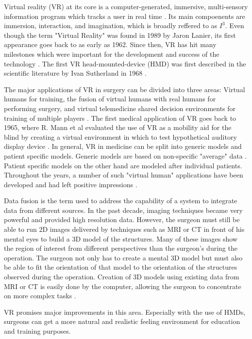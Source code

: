 Virtual reality (VR) at its core is a computer-generated, immersive, multi-sensory information program which tracks a user in real time \cite{burdea2003virtual}.
Its main compoenents are immersion, interaction, and imagination, which is broadly reffered to as $I^3$.
Even though the term "Virtual Reality" was found in 1989 by Jaron Lanier, its first appearance goes back to as early as 1962.
Since then, VR has hit many milestones which were important for the development and success of the technology \cite{burdea2003virtual}.
The first VR head-mounted-device (HMD) was first described in the scientific literature by Ivan Sutherland in 1968 \cite{sutherland1968head}.

The major applications of VR in surgery can be divided into three areas:
Virtual humans for training, the fusion of virtual humans with real humans for performing surgery, 
and virtual telemedicine shared decision environments for training of multiple players \cite{486713}.
The first medical application of VR goes back to 1965, where R. Mann et al evaluated the use of VR as a mobility aid for the blind by creating a virtual environment in which to test hypothetical auditory display device \cite{mann1965evaluation}.
In general, VR in medicine can be split into generic models and patient specific models.
Generic models are based on non-specific "average" data \cite{486713}.
\newline
Patient specific models on the other hand are modeled after individual patients.
Throughout the years, a number of such "virtual human" applications have been developed and had left positive impressions \cite{486713}.

Data fusion is the term used to address the capability of a system to integrate data from different sources.
In the past decade, imaging techniques became very powerful and provided high resolution data.
However, the surgeon must still be able to run 2D images delivered by techniques such as MRI or CT in front of his mental eyes to build a 3D model of the structures.
Many of these images show the region of interest from different perspectives than the surgeon’s during the operation.
The surgeon not only has to create a mental 3D model but must also be able to fit the orientation of that model to the orientation of the structures observed during the operation.
Creation of 3D models using existing data from MRI or CT is easily done by the computer, allowing the surgeon to concentrate on more complex tasks \cite{486713}.

VR promises major improvements in this area.
Especially with the use of HMDs, surgeons can get a more natural and realistic feeling environment for education and training purposes.

